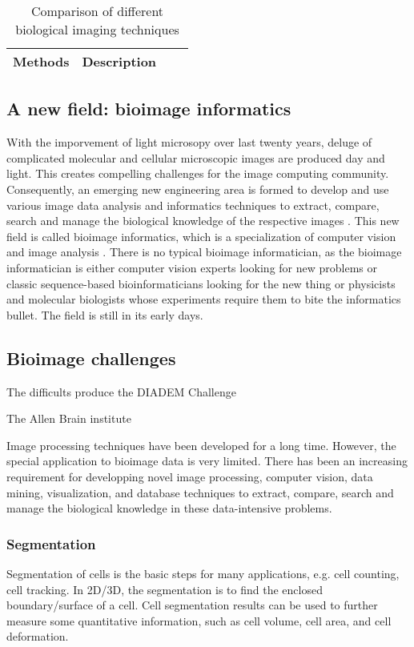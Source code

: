 \begin{table} \label{tab:intro-imaging}
\caption{Comparison of different biological imaging techniques}
\begin{center}
\begin{tabular}{cccc}
\hline
Methods	& Description \\ \hline

\end{tabular}
\end{center}
\end{table}



\subsection{A new field: bioimage informatics}
With the imporvement of light microsopy over last twenty years, deluge of complicated molecular and cellular microscopic images are produced day and light. This creates compelling challenges for the image computing community. Consequently, an emerging new engineering area is formed to develop and use various image data analysis and informatics techniques to extract, compare, search and manage the biological knowledge of the respective images \cite{peng2008bioimage}. This new field is called bioimage informatics, which is a specialization of computer vision and image analysis \cite{myers2012bioimage}. There is no typical bioimage informatician, as the bioimage informatician is either computer vision experts looking for new problems or classic sequence-based bioinformaticians looking for the new thing or physicists and molecular biologists whose experiments require them to bite the informatics bullet. The field is still in its early days.


\subsection{Bioimage challenges}
The difficults
produce the DIADEM Challenge

The Allen Brain institute

Image processing techniques have been developed for a long time. However, the special application to bioimage data is very limited. There has been an increasing requirement for developping novel image processing, computer vision, data mining, visualization, and database techniques to extract, compare, search and manage the biological knowledge in these data-intensive problems.

\subsubsection{Segmentation}
Segmentation of cells is the basic steps for many applications, e.g. cell counting, cell tracking. In 2D/3D, the segmentation is to find the enclosed boundary/surface of a cell. Cell segmentation results can be used to further measure some quantitative information, such as cell volume, cell area, and cell deformation. 

